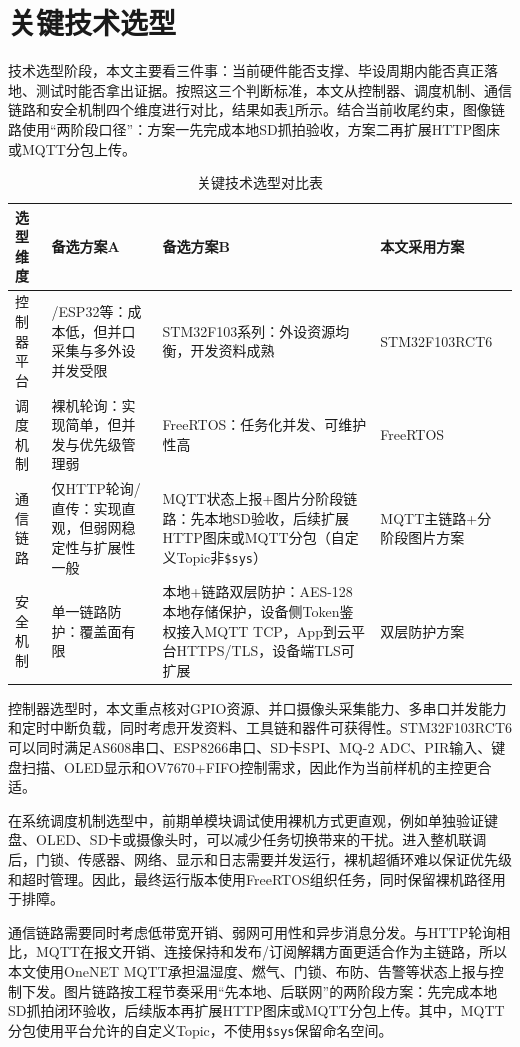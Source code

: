 \documentclass[UTF8,12pt,a4paper,oneside]{ctexbook}
\renewcommand{\arraystretch}{1.15}
\numberwithin{equation}{chapter}
\let\cite\supercite
\begin{document}
\section{关键技术选型}
技术选型阶段，本文主要看三件事：当前硬件能否支撑、毕设周期内能否真正落地、测试时能否拿出证据。按照这三个判断标准，本文从控制器、调度机制、通信链路和安全机制四个维度进行对比，结果如表\ref{tab:selection_matrix}所示。结合当前收尾约束，图像链路使用“两阶段口径”：方案一先完成本地SD抓拍验收，方案二再扩展HTTP图床或MQTT分包上传。
\begin{table}[H]
\centering
\caption{关键技术选型对比表}
\label{tab:selection_matrix}
\renewcommand{\arraystretch}{1.15}
\begin{tabular}{>{\raggedright\arraybackslash}p{2.5cm} >{\raggedright\arraybackslash}p{3.6cm} >{\raggedright\arraybackslash}p{3.6cm} >{\raggedright\arraybackslash}p{3.1cm}}
\toprule
选型维度 & 备选方案A & 备选方案B & 本文采用方案 \\
\midrule
控制器平台 & 51/ESP32等：成本低，但并口采集与多外设并发受限 & STM32F103系列：外设资源均衡，开发资料成熟 & STM32F103RCT6 \\
调度机制 & 裸机轮询：实现简单，但并发与优先级管理弱 & FreeRTOS：任务化并发、可维护性高 & FreeRTOS \\
通信链路 & 仅HTTP轮询/直传：实现直观，但弱网稳定性与扩展性一般 & MQTT状态上报+图片分阶段链路：先本地SD验收，后续扩展HTTP图床或MQTT分包（自定义Topic非\texttt{\$sys}） & MQTT主链路+分阶段图片方案 \\
安全机制 & 单一链路防护：覆盖面有限 & 本地+链路双层防护：AES-128本地存储保护，设备侧Token鉴权接入MQTT TCP，App到云平台HTTPS/TLS，设备端TLS可扩展 & 双层防护方案 \\
\bottomrule
\end{tabular}
\end{table}
\clearpage
控制器选型时，本文重点核对GPIO资源、并口摄像头采集能力、多串口并发能力和定时中断负载，同时考虑开发资料、工具链和器件可获得性。STM32F103RCT6可以同时满足AS608串口、ESP8266串口、SD卡SPI、MQ-2 ADC、PIR输入、键盘扫描、OLED显示和OV7670+FIFO控制需求，因此作为当前样机的主控更合适\cite{stm32_ref,stm32_rm0008}。

在系统调度机制选型中，前期单模块调试使用裸机方式更直观，例如单独验证键盘、OLED、SD卡或摄像头时，可以减少任务切换带来的干扰。进入整机联调后，门锁、传感器、网络、显示和日志需要并发运行，裸机超循环难以保证优先级和超时管理。因此，最终运行版本使用FreeRTOS组织任务，同时保留裸机路径用于排障\cite{freertos_book,freertos_sched}。

通信链路需要同时考虑低带宽开销、弱网可用性和异步消息分发。与HTTP轮询相比，MQTT在报文开销、连接保持和发布/订阅解耦方面更适合作为主链路，所以本文使用OneNET MQTT承担温湿度、燃气、门锁、布防、告警等状态上报与控制下发。图片链路按工程节奏采用“先本地、后联网”的两阶段方案：先完成本地SD抓拍闭环验收，后续版本再扩展HTTP图床或MQTT分包上传。其中，MQTT分包使用平台允许的自定义Topic，不使用\texttt{\$sys}保留命名空间\cite{mqtt_spec,mqtt_v5}。
\end{document}
